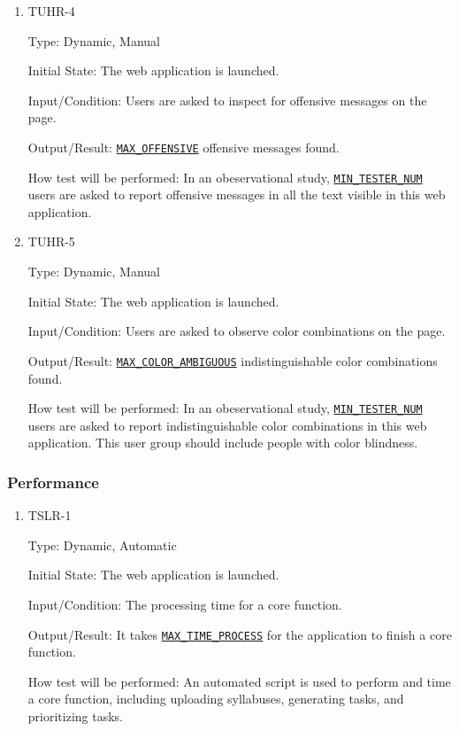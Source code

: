 \documentclass[12pt, titlepage]{article}
\begin{document}
\begin{enumerate}
\item{TUHR-4\\}\label{TUHR-4}

Type: Dynamic, Manual
					
Initial State: The web application is launched.
					
Input/Condition: Users are asked to inspect for offensive messages on the page.
					
Output/Result: \hyperref[MAX_OFFENSIVE]{\texttt{MAX\_OFFENSIVE}} offensive messages found.
					
How test will be performed: In an obeservational study, \hyperref[MIN_TESTER_NUM]{\texttt{MIN\_TESTER\_NUM}} users are asked to report offensive messages in all the text visible in this web application.

\item{TUHR-5\\}\label{TUHR-5}

Type: Dynamic, Manual
					
Initial State: The web application is launched.
					
Input/Condition: Users are asked to observe color combinations on the page.
					
Output/Result: \hyperref[MAX_COLOR_AMBIGUOUS]{\texttt{MAX\_COLOR\_AMBIGUOUS}} indistinguishable color combinations found.
					
How test will be performed: In an obeservational study, \hyperref[MIN_TESTER_NUM]{\texttt{MIN\_TESTER\_NUM}} users are asked to report indistinguishable color combinations in this web application. This user group should include people with color blindness.


\end{enumerate}

\subsubsection{Performance}

\begin{enumerate}
\item{TSLR-1\\}\label{TSLR-1}

Type: Dynamic, Automatic
					
Initial State: The web application is launched.
					
Input/Condition: The processing time for a core function.
					
Output/Result: It takes \hyperref[MAX_TIME_PROCESS]{\texttt{MAX\_TIME\_PROCESS}} for the application to finish a core function.
					
How test will be performed: An automated script is used to perform and time a core function, including uploading syllabuses, generating tasks, and prioritizing tasks.

\end{enumerate}
\end{document}
